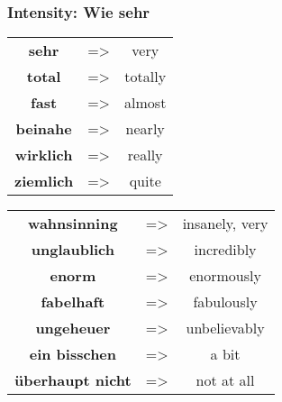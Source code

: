 \documentclass{ctexart}
\newcommand{\entry}[2]{\textbf{#1} & => & #2 \\}
\begin{document}
\subsubsection*{Intensity: Wie sehr}
\begin{table}[!h]
\begin{tabular}{ccc}
\entry{sehr}{very}
\entry{total}{totally}
\entry{fast}{almost}
\entry{beinahe}{nearly}
\entry{wirklich}{really}
\entry{ziemlich}{quite}
\end{tabular}
\begin{tabular}{ccc}
\entry{wahnsinning}{insanely, very}
\entry{unglaublich}{incredibly}
\entry{enorm}{enormously}
\entry{fabelhaft}{fabulously}
\entry{ungeheuer}{unbelievably}
\entry{ein bisschen}{a bit}
\entry{\"{u}berhaupt nicht}{not at all}
\end{tabular}
\end{table}
\end{document}
